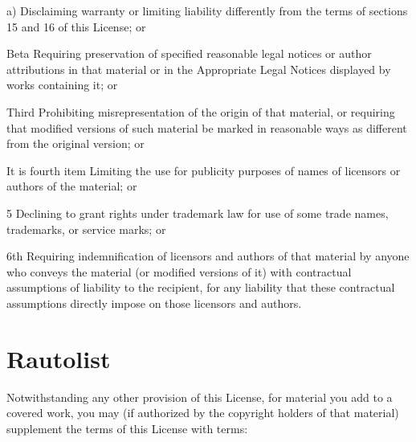 \documentclass{article}
\begin{document}
\begin{Lautolist}

\item[a)] Disclaiming warranty or limiting liability differently from the terms of sections 15 and 16 of this License; or

\item[Beta] Requiring preservation of specified reasonable legal notices or author attributions in that material or in the Appropriate Legal Notices displayed by works containing it; or

\item[Third] Prohibiting misrepresentation of the origin of that material, or requiring that modified versions of such material be marked in reasonable ways as different from the original version; or

\item[It is fourth item] Limiting the use for publicity purposes of names of licensors or authors of the material; or

\item[5] Declining to grant rights under trademark law for use of some trade names, trademarks, or service marks; or

\item[6th] Requiring indemnification of licensors and authors of that material by anyone who conveys the material (or modified versions of it) with contractual assumptions of liability to the recipient, for any liability that these contractual assumptions directly impose on those licensors and authors.

\end{Lautolist}

\section{Rautolist}

Notwithstanding any other provision of this License, for material you add to a covered work, you may (if authorized by the copyright holders of that material) supplement the terms of this License with terms:
\end{document}

